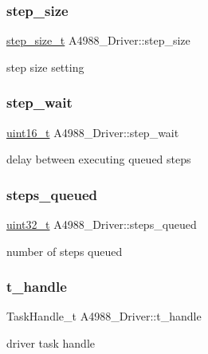 \subsubsection{\texorpdfstring{step\+\_\+size}{step\_size}}
{\footnotesize\ttfamily \hyperlink{group__A4988__definitions_gad84fc402211d9487e63ee884e4d79531}{step\+\_\+size\+\_\+t} A4988\+\_\+\+Driver\+::step\+\_\+size}

step size setting \mbox{\label{structA4988__Driver_a8d74f296177a2d3cf892d09ee816976a}} 
\subsubsection{\texorpdfstring{step\+\_\+wait}{step\_wait}}
{\footnotesize\ttfamily \hyperlink{vl53l0x__types_8h_a273cf69d639a59973b6019625df33e30}{uint16\+\_\+t} A4988\+\_\+\+Driver\+::step\+\_\+wait}

delay between executing queued steps \mbox{\label{structA4988__Driver_a14b08b6fabc9476b36d6a9330a0c83b2}} 
\subsubsection{\texorpdfstring{steps\+\_\+queued}{steps\_queued}}
{\footnotesize\ttfamily \hyperlink{vl53l0x__types_8h_a435d1572bf3f880d55459d9805097f62}{uint32\+\_\+t} A4988\+\_\+\+Driver\+::steps\+\_\+queued}

number of steps queued \mbox{\label{structA4988__Driver_a74e0833714f5b0b7d08c1dd00d8027e0}} 
\subsubsection{\texorpdfstring{t\+\_\+handle}{t\_handle}}
{\footnotesize\ttfamily Task\+Handle\+\_\+t A4988\+\_\+\+Driver\+::t\+\_\+handle}

driver task handle \mbox{\label{structA4988__Driver_a8775438d7522345042f8756d1c158567}} 
